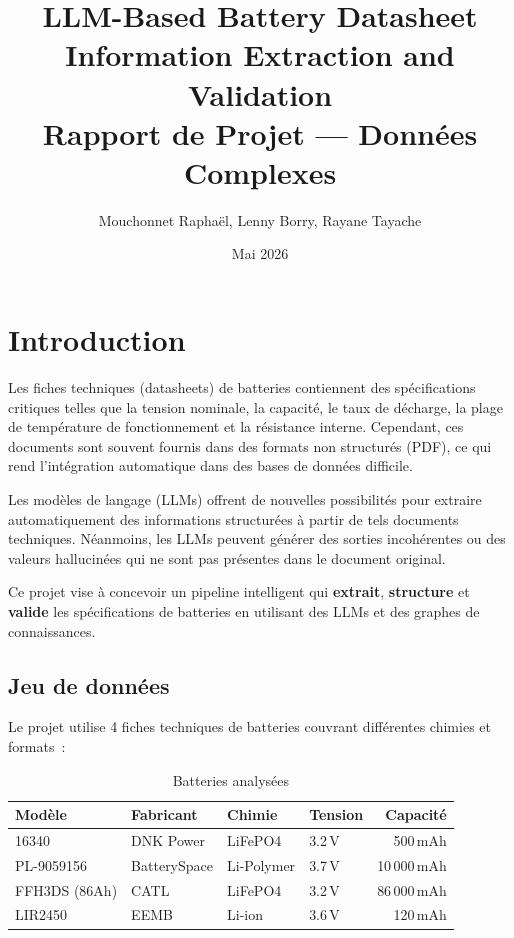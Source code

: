 \documentclass[12pt,a4paper]{article}
\title{\textbf{LLM-Based Battery Datasheet\\Information Extraction and Validation}\\[1em]
\large Rapport de Projet --- Donn\'ees Complexes}
\author{Mouchonnet Rapha\"el, Lenny Borry, Rayane Tayache}
\date{Mai 2026}
\begin{document}
\maketitle
\tableofcontents
\newpage

\section{Introduction}

Les fiches techniques (datasheets) de batteries contiennent des sp\'ecifications critiques telles que la tension nominale, la capacit\'e, le taux de d\'echarge, la plage de temp\'erature de fonctionnement et la r\'esistance interne. Cependant, ces documents sont souvent fournis dans des formats non structur\'es (PDF), ce qui rend l'int\'egration automatique dans des bases de donn\'ees difficile.

Les mod\`eles de langage (LLMs) offrent de nouvelles possibilit\'es pour extraire automatiquement des informations structur\'ees \`a partir de tels documents techniques. N\'eanmoins, les LLMs peuvent g\'en\'erer des sorties incoh\'erentes ou des valeurs hallucin\'ees qui ne sont pas pr\'esentes dans le document original.

Ce projet vise \`a concevoir un pipeline intelligent qui \textbf{extrait}, \textbf{structure} et \textbf{valide} les sp\'ecifications de batteries en utilisant des LLMs et des graphes de connaissances.

\subsection{Jeu de donn\'ees}

Le projet utilise 4 fiches techniques de batteries couvrant diff\'erentes chimies et formats~:

\begin{table}[H]
\centering
\caption{Batteries analys\'ees}
\begin{tabular}{llllr}
\toprule
\textbf{Mod\`ele} & \textbf{Fabricant} & \textbf{Chimie} & \textbf{Tension} & \textbf{Capacit\'e} \\
\midrule
16340 & DNK Power & LiFePO4 & 3.2\,V & 500\,mAh \\
PL-9059156 & BatterySpace & Li-Polymer & 3.7\,V & 10\,000\,mAh \\
FFH3DS (86Ah) & CATL & LiFePO4 & 3.2\,V & 86\,000\,mAh \\
LIR2450 & EEMB & Li-ion & 3.6\,V & 120\,mAh \\
\bottomrule
\end{tabular}
\end{table}
\end{document}

